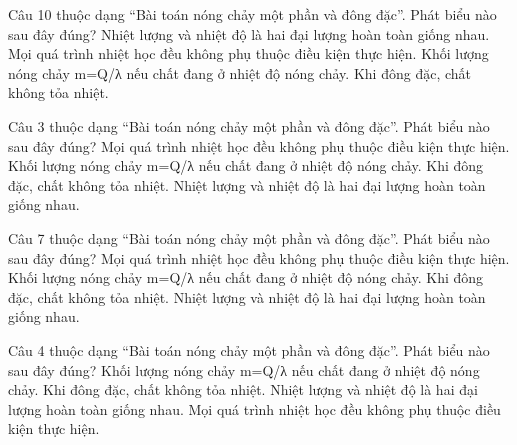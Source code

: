 
\begin{ex}
Câu 10 thuộc dạng “Bài toán nóng chảy một phần và đông đặc”. Phát biểu nào sau đây đúng?
\choice
{Nhiệt lượng và nhiệt độ là hai đại lượng hoàn toàn giống nhau.}
{Mọi quá trình nhiệt học đều không phụ thuộc điều kiện thực hiện.}
{\True Khối lượng nóng chảy m=Q/λ nếu chất đang ở nhiệt độ nóng chảy.}
{Khi đông đặc, chất không tỏa nhiệt.}
\end{ex}

\begin{ex}
Câu 3 thuộc dạng “Bài toán nóng chảy một phần và đông đặc”. Phát biểu nào sau đây đúng?
\choice
{Mọi quá trình nhiệt học đều không phụ thuộc điều kiện thực hiện.}
{\True Khối lượng nóng chảy m=Q/λ nếu chất đang ở nhiệt độ nóng chảy.}
{Khi đông đặc, chất không tỏa nhiệt.}
{Nhiệt lượng và nhiệt độ là hai đại lượng hoàn toàn giống nhau.}
\end{ex}

\begin{ex}
Câu 7 thuộc dạng “Bài toán nóng chảy một phần và đông đặc”. Phát biểu nào sau đây đúng?
\choice
{Mọi quá trình nhiệt học đều không phụ thuộc điều kiện thực hiện.}
{\True Khối lượng nóng chảy m=Q/λ nếu chất đang ở nhiệt độ nóng chảy.}
{Khi đông đặc, chất không tỏa nhiệt.}
{Nhiệt lượng và nhiệt độ là hai đại lượng hoàn toàn giống nhau.}
\end{ex}

\begin{ex}
Câu 4 thuộc dạng “Bài toán nóng chảy một phần và đông đặc”. Phát biểu nào sau đây đúng?
\choice
{\True Khối lượng nóng chảy m=Q/λ nếu chất đang ở nhiệt độ nóng chảy.}
{Khi đông đặc, chất không tỏa nhiệt.}
{Nhiệt lượng và nhiệt độ là hai đại lượng hoàn toàn giống nhau.}
{Mọi quá trình nhiệt học đều không phụ thuộc điều kiện thực hiện.}
\end{ex}

